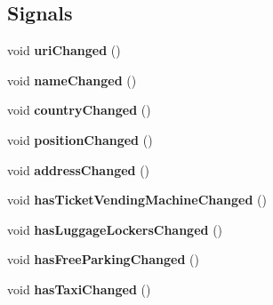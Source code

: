 \subsection*{Signals}
\begin{DoxyCompactItemize}
\item 
\mbox{\label{classStationEngine_1_1Station_a9768f01f112c58ebe3fdec8f7123bd7f}} 
void {\bfseries uri\+Changed} ()
\item 
\mbox{\label{classStationEngine_1_1Station_a61b7232a177c331c2b68634cf401fdce}} 
void {\bfseries name\+Changed} ()
\item 
\mbox{\label{classStationEngine_1_1Station_aaf68890e19657a56536af541f92036d2}} 
void {\bfseries country\+Changed} ()
\item 
\mbox{\label{classStationEngine_1_1Station_a5baf5f393c99bfecf52a65ad8913e901}} 
void {\bfseries position\+Changed} ()
\item 
\mbox{\label{classStationEngine_1_1Station_a5df6eee3f8c6c9a5d80605ade7eb1859}} 
void {\bfseries address\+Changed} ()
\item 
\mbox{\label{classStationEngine_1_1Station_a0d096cd9af6f827a61301fc33ae67e33}} 
void {\bfseries has\+Ticket\+Vending\+Machine\+Changed} ()
\item 
\mbox{\label{classStationEngine_1_1Station_accf725debefd301f181e302b2d7929f9}} 
void {\bfseries has\+Luggage\+Lockers\+Changed} ()
\item 
\mbox{\label{classStationEngine_1_1Station_a4a31e8e1ce8ea6cb4cad9e968fe62933}} 
void {\bfseries has\+Free\+Parking\+Changed} ()
\item 
\mbox{\label{classStationEngine_1_1Station_acaf18dd75aa9d4b91778fae49ab70f3c}} 
void {\bfseries has\+Taxi\+Changed} ()
\item 
\mbox{\label{classStationEngine_1_1Station_ab9ccdadf3595ed110811dc89b1f978be}} 

\end{DoxyCompactItemize}
